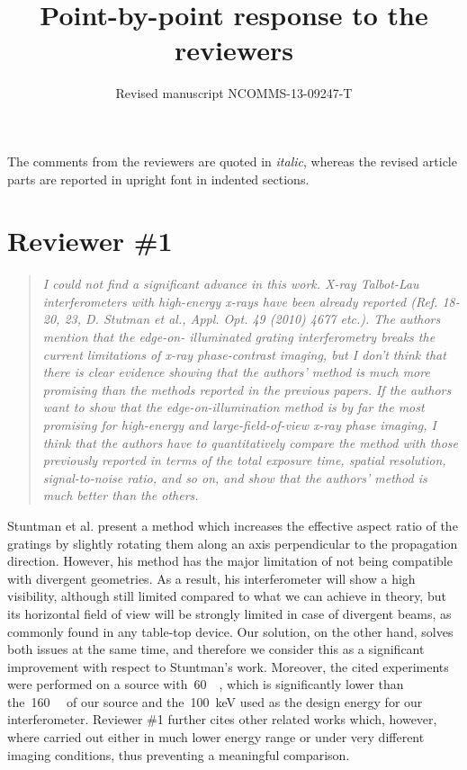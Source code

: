 \documentclass[a4paper,english]{scrartcl}
\title{Point-by-point response to the reviewers}
\author{Revised manuscript NCOMMS-13-09247-T}
\date{}
\newenvironment{reviewerquote}{\begin{quote}\itshape}{\end{quote}}
\begin{document}
\maketitle

\noindent
The comments from the reviewers are quoted in \emph{italic}, whereas the
revised article parts are reported in upright font in indented sections.
\section*{Reviewer \#1}
\begin{reviewerquote}
    I could not find a significant advance in this work. X-ray Talbot-Lau
    interferometers with high-energy x-rays have been already reported (Ref.
    18-20, 23, D. Stutman et al., Appl. Opt. 49 (2010) 4677 etc.). The
    authors mention that the edge-on- illuminated grating interferometry
    breaks the current limitations of x-ray phase-contrast imaging, but I
    don't think that there is clear evidence showing that the authors'
    method is much more promising than the methods reported in the previous
    papers. If the authors want to show that the edge-on-illumination method
    is by far the most promising for high-energy and large-field-of-view
    x-ray phase imaging, I think that the authors have to quantitatively
    compare the method with those previously reported in terms of the total
    exposure time, spatial resolution, signal-to-noise ratio, and so on, and
    show that the authors' method is much better than the others.
\end{reviewerquote}

Stuntman et al.  present a method which increases the effective
aspect ratio of the gratings by slightly rotating them along an axis
perpendicular to the propagation direction. However, his method has
the major limitation of not being compatible with divergent
geometries. As a result, his interferometer will show a high
visibility, although still limited compared to what we can achieve in
theory, but its horizontal field of view will be strongly limited in
case of divergent beams, as commonly found in any table-top device.
Our solution, on the other hand, solves both issues at the same time,
and therefore we consider this as a significant improvement with
respect to Stuntman's work.  Moreover, the cited experiments were
performed on a source with~\SI{60}{\kilo\voltpeak}, which is significantly lower than
the~\SI{160}{\kilo\voltpeak} of our source and the~\SI{100}{\kilo\eV} used as the design energy
for our interferometer. Reviewer \#1 further cites other related works
which, however, where carried out either in much lower energy range or
under very different imaging conditions, thus preventing a meaningful
comparison. 
\end{document}
